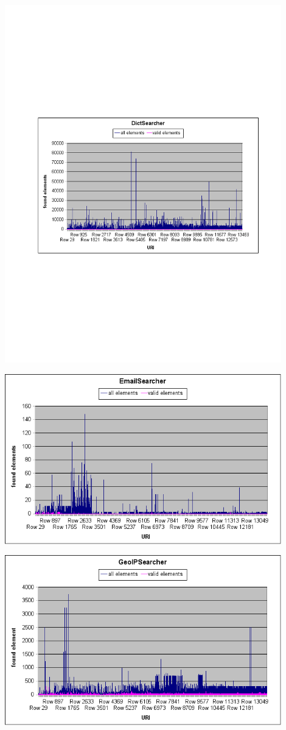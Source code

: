 \documentclass[11pt,a4paper]{article}
\begin{document}
\begin{center}
\includegraphics[width=120mm]{dict.png}

\includegraphics[width=120mm]{email.png}

\includegraphics[width=120mm]{geo.png}


\end{center}
\end{document}
